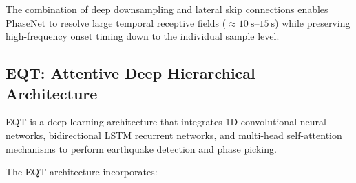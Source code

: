 
The combination of deep downsampling and lateral skip connections enables
\ac{PhaseNet} to resolve large temporal receptive fields ($\approx
\qtyrange{10}{15}{\second}$)
while preserving high-frequency onset timing down to the individual
sample level.

\subsection{\acs{EQT}: Attentive Deep Hierarchical Architecture}
\label{subsec:eqt_arch}

\ac{EQT} is a deep learning architecture that integrates 1D
convolutional neural networks, bidirectional \ac{LSTM} recurrent
networks, and multi-head self-attention mechanisms
to perform earthquake detection and phase picking.

The \acf{EQT} architecture incorporates:

